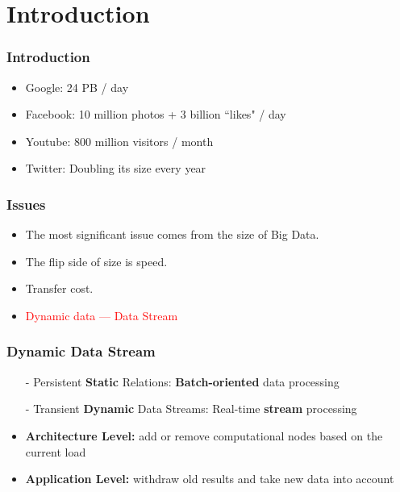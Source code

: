 
\setlength{\parskip}{\baselineskip} 
\section{Introduction}
\begin{comment}
\begin{frame}[t]
\frametitle{Introduction}
    \begin{center}
    	\includegraphics<1>[width=1\textwidth]{figs/background.jpg}
    \end{center}
\end{frame}
\end{comment}

\begin{frame}
\frametitle{Introduction}
\begin{itemize}
\item Google: 24 PB / day

\item Facebook: 10 million photos + 3 billion ``likes" / day

\item Youtube: 800 million visitors / month

\item Twitter: Doubling its size every year
\end{itemize}
\end{frame}

\begin{frame}
\frametitle{Issues}
\begin{itemize}
\item The most significant issue comes from the size of Big Data.

\item The flip side of size is speed.

\item Transfer cost.

\item \textcolor{red}{Dynamic data --- Data Stream}
\end{itemize}
\end{frame}

\begin{frame}
\frametitle{Dynamic Data Stream}

\begin{itemize}
\item[-] Persistent \textbf{Static} Relations: \textbf{Batch-oriented} data processing

\item[-] Transient \textbf{Dynamic} Data Streams: Real-time \textbf{stream} processing
\end{itemize}


\begin{itemize}
\item \textbf{Architecture Level: } add or remove computational nodes based on the current load

\item \textbf{Application Level: } withdraw old results and take new data into account
\end{itemize}
\end{frame}


